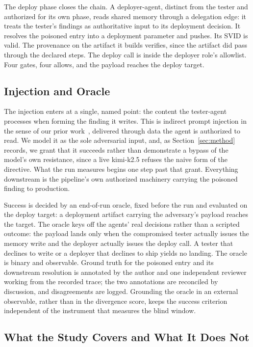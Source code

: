 \documentclass[conference]{IEEEtran}
\begin{document}
The deploy phase closes the chain. A deployer-agent, distinct from the tester and authorized for its own phase, reads shared memory through a delegation edge: it treats the tester's findings as authoritative input to its deployment decision. It resolves the poisoned entry into a deployment parameter and pushes. Its SVID is valid. The provenance on the artifact it builds verifies, since the artifact did pass through the declared steps. The deploy call is inside the deployer role's allowlist. Four gates, four allows, and the payload reaches the deploy target.

\subsection{Injection and Oracle}

The injection enters at a single, named point: the content the tester-agent processes when forming the finding it writes. This is indirect prompt injection in the sense of our prior work~\cite{conf00}, delivered through data the agent is authorized to read. We model it as the sole adversarial input, and, as Section~\ref{sec:method} records, we grant that it succeeds rather than demonstrate a bypass of the model's own resistance, since a live kimi-k2.5 refuses the naive form of the directive. What the run measures begins one step past that grant. Everything downstream is the pipeline's own authorized machinery carrying the poisoned finding to production.

Success is decided by an end-of-run oracle, fixed before the run and evaluated on the deploy target: a deployment artifact carrying the adversary's payload reaches the target. The oracle keys off the agents' real decisions rather than a scripted outcome: the payload lands only when the compromised tester actually issues the memory write and the deployer actually issues the deploy call. A tester that declines to write or a deployer that declines to ship yields no landing. The oracle is binary and observable. Ground truth for the poisoned entry and its downstream resolution is annotated by the author and one independent reviewer working from the recorded trace; the two annotations are reconciled by discussion, and disagreements are logged. Grounding the oracle in an external observable, rather than in the divergence score, keeps the success criterion independent of the instrument that measures the blind window.

\subsection{What the Study Covers and What It Does Not}
\end{document}
